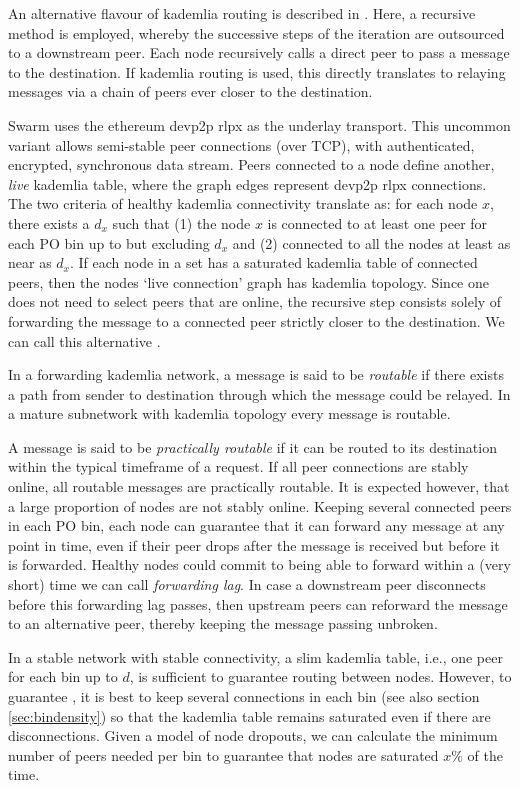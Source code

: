 An alternative flavour of kademlia routing is described in \cite{heep2010r}. Here, a recursive method is employed, whereby the successive steps of the iteration are outsourced to a downstream peer.
Each node recursively calls a direct peer to pass a message to the destination. If kademlia routing is used, this directly translates to relaying messages via a chain of peers ever closer to the destination.

Swarm uses the ethereum devp2p rlpx  as the underlay transport. This uncommon variant allows semi-stable peer connections (over TCP), with authenticated, encrypted, synchronous data stream. Peers connected to a node define another, \emph{live} kademlia table, 
where the graph edges represent devp2p rlpx connections. 
The two criteria of healthy kademlia connectivity translate as: for each node $x$, there exists a $d_x$ such that (1) the node $x$ is connected to at least one peer for each PO bin up to but excluding      $d_x$ and (2) connected to all the nodes at least as near as $d_x$.
If each node in a set has a saturated kademlia table of connected peers, then the nodes `live connection' graph has kademlia topology.
Since one does not need to select peers that are online, the recursive step consists solely of forwarding the message to a connected peer strictly closer to the destination. We can call this alternative . 

In a forwarding kademlia network, a message is said to be \emph{routable} if there exists a path from sender to destination through which the message could be relayed. 
In a mature subnetwork with kademlia topology every message is routable. 


A message is said to be \emph{practically routable} if it can be routed to its destination within the typical timeframe of a request. If all peer connections are stably online, all routable messages are practically routable. It is expected however, that a large proportion of nodes are not stably online. Keeping several connected peers in each PO bin, each node can guarantee that it can forward any message at any point in time, even if their peer drops after the message is received but before it is forwarded. Healthy nodes could commit to being able to forward within a (very short) time we can call \emph{forwarding lag}. In case a downstream peer disconnects before this forwarding lag passes, then upstream peers can reforward the message to an alternative peer, thereby keeping the message passing unbroken. 

In a stable network with stable connectivity, a slim kademlia table, i.e., one peer for each bin up to $d$, is sufficient to guarantee routing between nodes.
However, to guarantee , it is best to keep several connections in each bin (see also section \ref{sec:bindensity}) so that the kademlia table remains saturated even if there are disconnections. Given a model of node dropouts, we can calculate the minimum number of peers needed per bin to guarantee that  nodes are saturated $x\%$ of the time.

